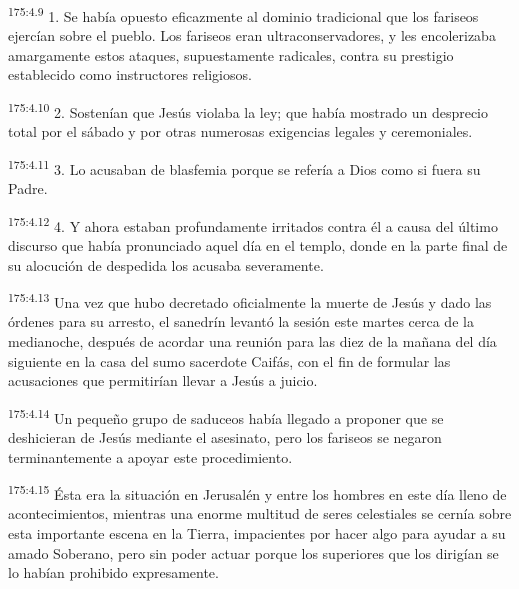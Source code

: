 \par 
\textsuperscript{175:4.9} 1. Se había opuesto eficazmente al dominio tradicional que los fariseos ejercían sobre el pueblo. Los fariseos eran ultraconservadores, y les encolerizaba amargamente estos ataques, supuestamente radicales, contra su prestigio establecido como instructores religiosos.

\par 
\textsuperscript{175:4.10} 2. Sostenían que Jesús violaba la ley; que había mostrado un desprecio total por el sábado y por otras numerosas exigencias legales y ceremoniales.

\par 
\textsuperscript{175:4.11} 3. Lo acusaban de blasfemia porque se refería a Dios como si fuera su Padre.

\par 
\textsuperscript{175:4.12} 4. Y ahora estaban profundamente irritados contra él a causa del último discurso que había pronunciado aquel día en el templo, donde en la parte final de su alocución de despedida los acusaba severamente.

\par 
\textsuperscript{175:4.13} Una vez que hubo decretado oficialmente la muerte de Jesús y dado las órdenes para su arresto, el sanedrín levantó la sesión este martes cerca de la medianoche, después de acordar una reunión para las diez de la mañana del día siguiente en la casa del sumo sacerdote Caifás, con el fin de formular las acusaciones que permitirían llevar a Jesús a juicio.

\par 
\textsuperscript{175:4.14} Un pequeño grupo de saduceos había llegado a proponer que se deshicieran de Jesús mediante el asesinato, pero los fariseos se negaron terminantemente a apoyar este procedimiento.

\par 
\textsuperscript{175:4.15} Ésta era la situación en Jerusalén y entre los hombres en este día lleno de acontecimientos, mientras una enorme multitud de seres celestiales se cernía sobre esta importante escena en la Tierra, impacientes por hacer algo para ayudar a su amado Soberano, pero sin poder actuar porque los superiores que los dirigían se lo habían prohibido expresamente.